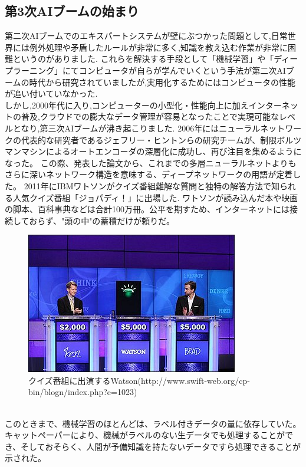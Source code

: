 \subsection{第3次AIブームの始まり}
第二次AIブームでのエキスパートシステムが壁にぶつかった問題として,日常世界には例外処理や矛盾したルールが非常に多く,知識を教え込む作業が非常に困難というのがありました.
これらを解決する手段として「機械学習」や「ディープラーニング」にてコンピュータが自らが学んでいくという手法が第二次AIブームの時代から研究されていましたが,実用化するためにはコンピュータの性能が追い付いていなかった.\\
しかし,2000年代に入り,コンピューターの小型化・性能向上に加えインターネットの普及,クラウドでの膨大なデータ管理が容易となったことで実現可能なレベルとなり,第三次AIブームが沸き起こりました.
2006年にはニューラルネットワークの代表的な研究者であるジェフリー・ヒントンらの研究チームが、制限ボルツマンマシンによるオートエンコーダの深層化に成功し、再び注目を集めるようになった。
この際、発表した論文から、これまでの多層ニューラルネットよりもさらに深いネットワーク構造を意味する、ディープネットワークの用語が定着した。
2011年にIBMワトソンがクイズ番組難解な質問と独特の解答方法で知られる人気クイズ番組「ジョパディ！」に出場した.
ワトソンが読み込んだ本や映画の脚本、百科事典などは合計100万冊。公平を期すため、インターネットには接続しておらず、"頭の中"の蓄積だけが頼りだ。
\begin{figure}[!ht]
    \begin{screen}
    \begin{center}
        \includegraphics[scale=1.0, clip]{./img/Watson.jpg}
        \caption{クイズ番組に出演するWatson\newline(http://www.swift-web.org/cp-bin/blogn/index.php?e=1023)}
        \label{fig:クイズ番組に出演するWatson}
    \end{center}
\end{screen}
\end{figure}\\
このときまで、機械学習のほとんどは、ラベル付きデータの量に依存していた。
キャットペーパーにより、機械がラベルのない生データでも処理することができ、そしておそらく、人間が予備知識を持たないデータですら処理できることが示された。
